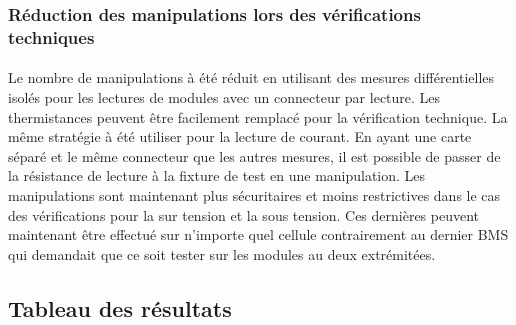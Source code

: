 		\subsubsection{Réduction des manipulations lors des vérifications techniques}
	
			\paragraph{}
			Le nombre de manipulations à été réduit en utilisant des mesures différentielles isolés pour les lectures de modules avec un connecteur par lecture. Les thermistances peuvent être facilement remplacé pour la vérification technique. La même stratégie à été utiliser pour la lecture de courant. En ayant une carte séparé et le même connecteur que les autres mesures, il est possible de passer de la résistance de lecture à la fixture de test en une manipulation. Les manipulations sont maintenant plus sécuritaires et moins restrictives dans le cas des vérifications pour la sur tension et la sous tension. Ces dernières peuvent maintenant être effectué sur n'importe quel cellule contrairement au dernier BMS qui demandait que ce soit tester sur les modules au deux extrémitées.


	\subsection{Tableau des résultats}

		\paragraph{}
		

